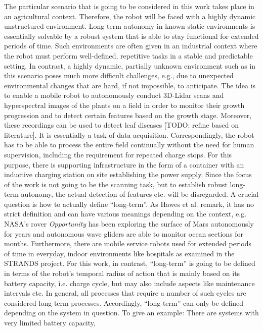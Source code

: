 \documentclass[english, master, utf8]{base/thesis_KBS}
\begin{document}
The particular scenario that is going to be considered in this work takes place in an agricultural context. Therefore, the robot will be faced with a highly dynamic unstructured
environment. Long-term autonomy in known static environments is essentially solvable by a robust system that is able to
stay functional for extended periods of time. \cite{Kunze:2018} Such environments are often given in an industrial context where the robot must perform well-defined, repetitive tasks
in a stable and predictable setting. \cite{Bechar:2016}
In contrast, a highly dynamic, partially unknown environment such as in this scenario poses much more difficult
challenges, e.g., due to unexpected environmental changes that are hard, if not impossible, to anticipate.
The idea is to enable a mobile robot to autonomously conduct 3D-Lidar scans and hyperspectral images of the plants on a field in order to monitor their growth progression and 
to detect certain features based on the growth stage. Moreover, these recordings can be used to detect leaf diseases [TODO: refine based on literature]. It is essentially a task of
data acquisition.
Correspondingly, the robot has to be able to process the entire field continually without the need for human supervision,
including the requirement for repeated charge stops. For this purpose, there is supporting infrastructure in the form of a container with an inductive charging station on site
establishing the power supply. Since the focus of the work is not going to be the scanning task, but to establish robust long-term autonomy, the actual detection of features 
etc. will be disregarded.
A crucial question is how to actually define ``long-term''. As Hawes et al. remark, it has no strict definition and can have various meanings depending
on the context, e.g. NASA's rover \textit{Opportunity} has been exploring the surface of Mars autonomously for years and autonomous wave gliders are able to monitor
ocean sections for months. Furthermore, there are mobile service robots used for extended periods of time in everyday, indoor environments like hospitals 
as examined in the STRANDS project. \cite{Hawes:2017}
For this work, in contrast, ``long-term'' is going to be defined in terms of the robot's temporal radius of action that is mainly based on its battery capacity, i.e. charge cycle,
but may also include aspects like maintenance intervals etc. In general, all processes that require a number of such cycles are considered long-term processes.
Accordingly, ``long-term'' can only be defined depending on the system in question. To give an example: There are systems with very limited battery capacity, 
\end{document}
